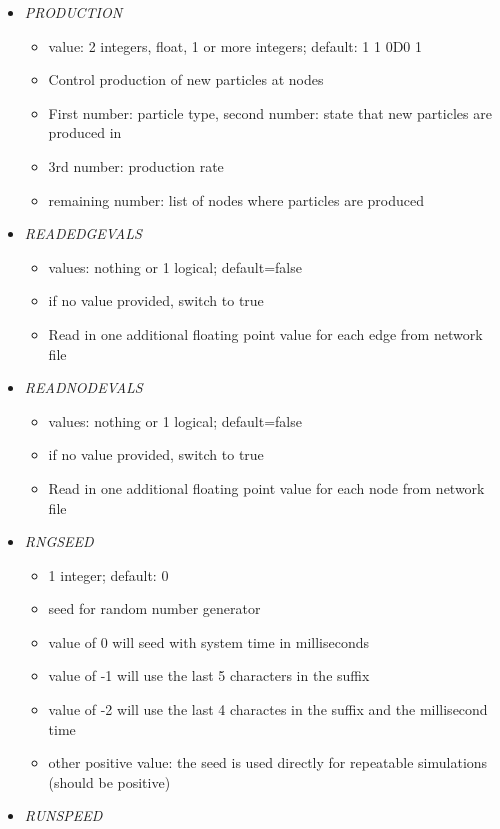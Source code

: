\documentclass[12pt]{article}
\begin{document}
\begin{itemize}
\begin{itemize}
\end{itemize}
%
\item {\it PRODUCTION}
\begin{itemize}
	\item  value: 2 integers, float, 1 or more integers; default: 1 1 0D0 1
	\item Control production of new particles at nodes
	\item First number: particle type, second number: state that new particles are produced in
	\item 3rd number: production rate
	\item remaining number: list of nodes where particles are produced
\end{itemize}
%
\item {\it READEDGEVALS}
\begin{itemize}
	\item values: nothing or 1 logical; default=false
	\item if no value provided, switch to true
	\item Read in one additional floating point value for each edge from network file
\end{itemize}
%
\item {\it READNODEVALS}
\begin{itemize}
	\item values: nothing or 1 logical; default=false
	\item if no value provided, switch to true
	\item Read in one additional floating point value for each node from network file
\end{itemize}
%
\item {\it RNGSEED}
  \begin{itemize}
    \item 1 integer; default: 0
    \item seed for random number generator
    \item value of 0 will seed with system time in milliseconds
    \item value of -1 will use the last 5 characters in the suffix
    \item value of -2 will use the last 4 charactes in the suffix and the millisecond time
    \item other positive value: the seed is used directly for repeatable simulations (should be positive)
  \end{itemize}
%
\item {\it RUNSPEED}
\begin{itemize}

\end{itemize}
\end{itemize}
\end{document}
